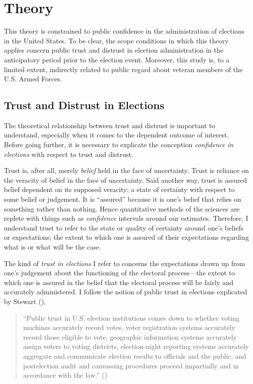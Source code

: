 \documentclass[
  12pt,
  letterpaper,
]{article}
\begin{document}
\section{Theory}\label{theory}

This theory is constrained to public confidence in the administration of
elections in the United States. To be clear, the scope conditions in
which this theory applies concern public trust and distrust in election
administration in the anticipatory period prior to the election event.
Moreover, this study is, to a limited extent, indirectly related to
public regard about veteran members of the U.S. Armed Forces.

\subsection{Trust and Distrust in
Elections}\label{trust-and-distrust-in-elections}

The theoretical relationship between trust and distrust is important to
understand, especially when it comes to the dependent outcome of
interest. Before going further, it is necessary to explicate the
conception \emph{confidence in elections} with respect to trust and
distrust.

Trust is, after all, merely \emph{belief} held in the face of
uncertainty. Trust is reliance on the veracity of belief in the face of
uncertainty. Said another way, trust is assured belief dependent on its
supposed veracity; a state of certainty with respect to some belief or
judgement. It is ``assured'' because it is one's belief that relies on
something rather than nothing. Hence quantitative methods of the
sciences are replete with things such as \emph{confidence} intervals
around our estimates. Therefore, I understand trust to refer to the
state or quality of certainty around one's beliefs or expectations; the
extent to which one is assured of their expectations regarding what is
or what will be the case.

The kind of \emph{trust in elections} I refer to concerns the
expectations drawn up from one's judgement about the functioning of the
electoral process---the extent to which one is assured in the belief
that the electoral process will be fairly and accurately administered. I
follow the notion of public trust in elections explicated by Stewart
(),

\begin{quote}
``Public trust in U.S. election institutions comes down to whether
voting machines accurately record votes, voter registration systems
accurately record those eligible to vote, geographic information systems
accurately assign voters to voting districts, election-night reporting
systems accurately aggregate and communicate election results to
officials and the public, and postelection audit and canvassing
procedures proceed impartially and in accordance with the law.''
()
\end{quote}
\end{document}
